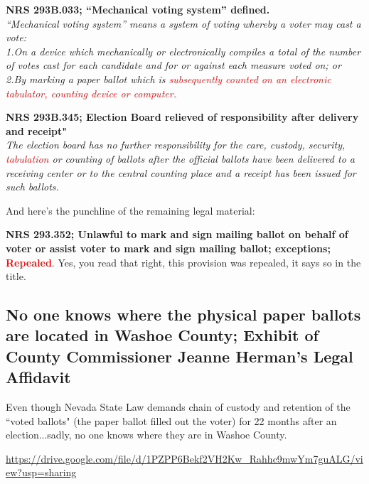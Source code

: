 \documentclass[preprint,13pt]{elsarticle}
\begin{document}
\textbf{NRS 293B.033; “Mechanical voting system” defined.}\\
\textit{“Mechanical voting system” means a system of voting whereby a voter may cast a vote:\\
1.On a device which mechanically or electronically compiles a total of the number of votes cast for each candidate and for or against each measure voted on; or\\
2.By marking a paper ballot which is \textcolor{red}{subsequently counted on an electronic tabulator, counting device or computer.}}

\textbf{NRS 293B.345; Election Board relieved of responsibility after delivery and receipt"}\\
\textit{The election board has no further responsibility for the care, custody, security, \textcolor{red}{tabulation} or counting of ballots after the official ballots have been delivered to a receiving center or to the central counting place and a receipt has been issued for such ballots.}

And here's the punchline of the remaining legal material:

\textbf{NRS 293.352; Unlawful to mark and sign mailing ballot on behalf of voter or assist voter to mark and sign mailing ballot; exceptions; \textcolor{red}{Repealed}}. Yes, you read that right, this provision was repealed, it says so in the title.
\newpage
\subsection{No one knows where the physical paper ballots are located in Washoe County; Exhibit of County Commissioner 
 Jeanne Herman's Legal Affidavit}

Even though Nevada State Law demands chain of custody and retention of the ``voted ballots"  (the paper ballot filled out the voter) for 22 months after an election...sadly, no one knows where they are in Washoe County.

\url{https://drive.google.com/file/d/1PZPP6Bekf2VH2Kw_Rahhc9mwYm7guALG/view?usp=sharing}
\end{document}
